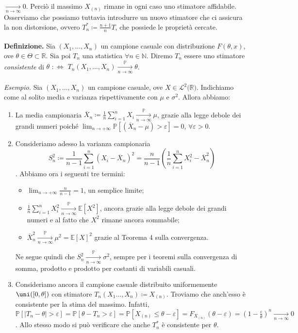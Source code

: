 $\xrightarrow[n\rightarrow \infty]{}0$. Perciò il massimo $X_{(n)}$ rimane in ogni caso uno stimatore affidabile. Osserviamo che possiamo tuttavia introdurre un nuovo stimatore che ci assicura la non distorsione, ovvero $T_n^*\coloneqq \frac{n+1}{n}T$, che possiede le proprietà cercate. \\ \\
\textbf{Definizione.} Sia $(X_1,\ldots,X_n)$ un campione casuale con distribuzione $F(\theta,x)$, ove $\theta\in \Theta\subset \mathbb{R}$. Sia poi $T_n$ una statistica $\forall n\in \mathbb{N}$. Diremo $T_n$ essere uno stimatore \textit{consistente} di $\theta$ $:\Longleftrightarrow$ $T_n(X_1,\ldots,X_n)\xrightarrow[n\rightarrow \infty]{\mathbb{P}} \theta$. \\ \\
\textit{Esempio.} Sia $(X_1,\ldots,X_n)$ un campione casuale, ove $X\in \mathcal{L}^2(\mathbb{R)}$. Indichiamo come al solito media e varianza rispettivamente con $\mu$ e $\sigma^2$. Allora abbiamo:
\begin{enumerate}
\item La media campionaria $\overline{X}_n\coloneqq \frac{1}{n}\sum_{i=1}^n X_i\xrightarrow[n\rightarrow \infty]{\mathbb{P}} \mu$, grazie alla legge debole dei grandi numeri poiché $\lim_{n\rightarrow +\infty} \mathbb{P}[(\overline{X}_n-\mu)>\varepsilon ]=0$, $\forall \varepsilon >0$.
\item Consideriamo adesso la varianza campionaria $$S_n^2\coloneqq \frac{1}{n-1}\sum_{i=1}^n (X_i-\overline{X}_n)^2=\frac{n}{n-1}\left(\frac{1}{n}\sum_{i=1}^n X_i^2-\overline{X}_n^2\right)$$. Abbiamo ora i seguenti tre termini:
\begin{itemize}
\item $\lim_{n\rightarrow +\infty} \frac{n}{n-1}=1$, un semplice limite;
\item $\frac{1}{n}\sum_{i=1}^n X_i^2 \xrightarrow[n\rightarrow \infty]{\mathbb{P}} \mathbb{E}[X^2]$, ancora grazie alla legge debole dei grandi numeri e al fatto che $X^2$ rimane ancora sommabile;
\item $\overline{X}_n^2 \xrightarrow[n\rightarrow \infty]{\mathbb{P}} \mu^2=\mathbb{E}[X]^2$ grazie al Teorema 4 sulla convergenza.
\end{itemize}
Ne segue quindi che $S_n^2 \xrightarrow[n\rightarrow \infty]{\mathbb{P}} \sigma^2$, sempre per i teoremi sulla convergenza di somma, prodotto e prodotto per costanti di variabili casuali.
\item Consideriamo ancora il campione casuale distribuito uniformemente $\uni([0,\theta])$ con stimatore $T_n(X_1\ldots,X_n)\coloneqq X_{(n)}$. Troviamo che anch'esso è consistente per la stima del massimo. Infatti, $\mathbb{P}[|T_n-\theta|>\varepsilon]=\mathbb{P}[\theta-T_n>\varepsilon]=\mathbb{P}[X_{(n)}\leq \theta-\varepsilon]=F_{X_{(n)}}(\theta -\varepsilon)=\left(1-\frac{\varepsilon}{\theta}\right)^n \xrightarrow[n\rightarrow \infty]{} 0$. Allo stesso modo si può verificare che anche $T_n^*$ è consistente per $\theta$.
\end{enumerate}
